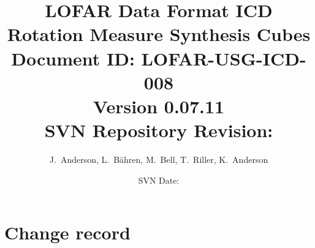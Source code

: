 \documentclass[a4paper,10pt,bibtotoc]{scrartcl}
\begin{document}

\title{LOFAR Data Format ICD \\ Rotation Measure Synthesis Cubes \\
{\normalsize Document ID: LOFAR-USG-ICD-008} \\ 
{\normalsize Version 0.07.11} \\
{\normalsize SVN Repository Revision: \svnInfoMaxRevision}}
\author{J.~Anderson, L.~B\"ahren, M.~Bell, T.~Riller, K.~Anderson}
\date{\small{SVN Date: \svnInfoDate}}
\maketitle

\tableofcontents
\listoffigures
\listoftables
\clearpage


\section*{Change record}
\end{document}
